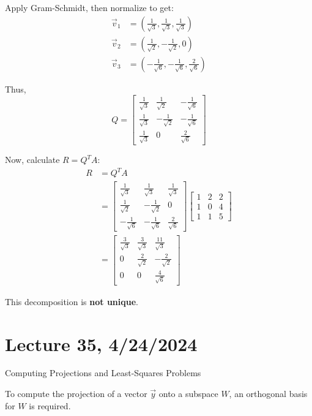 \documentclass{article}
\begin{document}
Apply Gram-Schmidt, then normalize to get:
\[
\begin{aligned}
\vec{v}_1 &= \left(\frac{1}{\sqrt{3}}, \frac{1}{\sqrt{3}}, \frac{1}{\sqrt{3}}\right) \\
\vec{v}_2 &= \left(\frac{1}{\sqrt{2}}, -\frac{1}{\sqrt{2}}, 0\right) \\
\vec{v}_3 &= \left(-\frac{1}{\sqrt{6}}, -\frac{1}{\sqrt{6}}, \frac{2}{\sqrt{6}}\right)
\end{aligned}
\]

Thus,
\[
Q = \begin{bmatrix} 
\frac{1}{\sqrt{3}} & \frac{1}{\sqrt{2}} & -\frac{1}{\sqrt{6}} \\
\frac{1}{\sqrt{3}} & -\frac{1}{\sqrt{2}} & -\frac{1}{\sqrt{6}} \\
\frac{1}{\sqrt{3}} & 0 & \frac{2}{\sqrt{6}} 
\end{bmatrix}
\]

Now, calculate \( R = Q^T A \):
\[
\begin{aligned}
R &= Q^T A \\
&= \begin{bmatrix} 
\frac{1}{\sqrt{3}} & \frac{1}{\sqrt{3}} & \frac{1}{\sqrt{3}} \\
\frac{1}{\sqrt{2}} & -\frac{1}{\sqrt{2}} & 0 \\
-\frac{1}{\sqrt{6}} & -\frac{1}{\sqrt{6}} & \frac{2}{\sqrt{6}} 
\end{bmatrix}
\begin{bmatrix} 
1 & 2 & 2 \\
1 & 0 & 4 \\
1 & 1 & 5 
\end{bmatrix} \\
&= \begin{bmatrix} 
\frac{3}{\sqrt{3}} & \frac{3}{\sqrt{3}} & \frac{11}{\sqrt{3}} \\
0 & \frac{2}{\sqrt{2}} & -\frac{2}{\sqrt{2}} \\
0 & 0 & \frac{4}{\sqrt{6}} 
\end{bmatrix}
\end{aligned}
\]

This decomposition is \textbf{not unique}.

\section{Lecture 35, 4/24/2024}

Computing Projections and Least-Squares Problems

To compute the projection of a vector $\vec{y}$ onto a subspace $W$, an orthogonal basis for $W$ is required.
\end{document}

